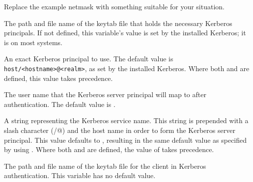 \begin{description}
  Replace the example netmask with something suitable for your situation.

\label{param:KerberosServerKeytab}
\item[\Macro{KERBEROS\_SERVER\_KEYTAB}]
  The path and file name of the keytab file that holds the necessary Kerberos
  principals.
  If not defined, this variable's value is set by the installed Kerberos;
  it is  on most systems.

\label{param:KerberosServerPrincipal}
\item[\Macro{KERBEROS\_SERVER\_PRINCIPAL}]
  An exact Kerberos principal to use.
  The default value is \verb$host/<hostname>@<realm>$, as set by the
  installed Kerberos.
  Where both  and
   are defined, this value takes
  precedence.

\label{param:KerberosServerUser}
\item[\Macro{KERBEROS\_SERVER\_USER}]
  The user name that the Kerberos server principal will map to after
  authentication.
  The default value is \verb@condor@.

\label{param:KerberosServerService}
\item[\Macro{KERBEROS\_SERVER\_SERVICE}]
  A string representing the Kerberos service name.
  This string is prepended with a slash character (\verb@/@) and the host name
  in order to form the Kerberos server principal.
  This value defaults to \verb@host@, resulting in the same default value
  as specified by using .
  Where both  and
   are defined, the value of
   takes precedence.


\label{param:KerberosClientKeytab}
\item[\Macro{KERBEROS\_CLIENT\_KEYTAB}]
  The path and file name of the keytab file for the client
  in Kerberos authentication.
  This variable has no default value.

\end{description}

